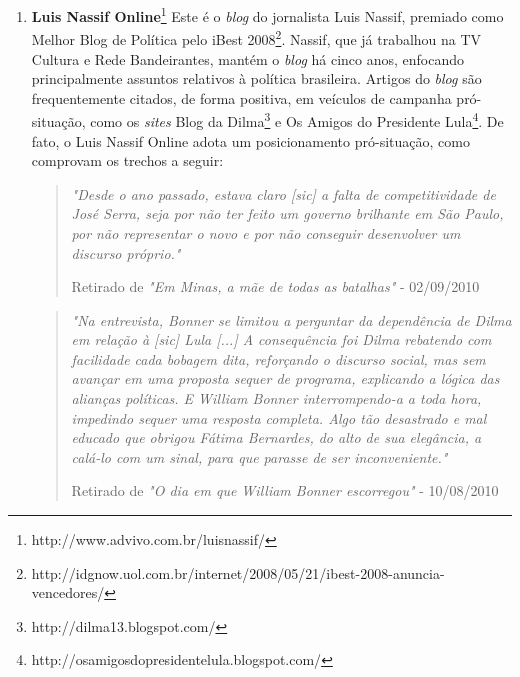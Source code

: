 \begin{enumerate}

\item \textbf{Luis Nassif Online}\footnote{http://www.advivo.com.br/luisnassif/} Este é o \emph{blog} do jornalista Luis Nassif, premiado como Melhor Blog de Política pelo iBest 2008\footnote{http://idgnow.uol.com.br/internet/2008/05/21/ibest-2008-anuncia-vencedores/}. Nassif, que já trabalhou na TV Cultura e Rede Bandeirantes, mantém o \emph{blog} há cinco anos, enfocando principalmente assuntos relativos à política brasileira. Artigos do \emph{blog} são frequentemente citados, de forma positiva, em veículos de campanha pró-situação, como os \emph{sites} Blog da Dilma\footnote{http://dilma13.blogspot.com/} e Os Amigos do Presidente Lula\footnote{http://osamigosdopresidentelula.blogspot.com/}. De fato, o Luis Nassif Online adota um posicionamento pró-situação, como comprovam os trechos a seguir:

\begin{quote}
\emph{"Desde o ano passado, estava claro [sic] a falta de competitividade de José Serra, seja por não ter feito um governo brilhante em São Paulo, por não representar o novo e por não conseguir desenvolver um discurso próprio."}

{\small Retirado de \emph{"Em Minas, a mãe de todas as batalhas"} - 02/09/2010} 
\end{quote}

\begin{quote}

\emph{"Na entrevista, Bonner se limitou a perguntar da dependência de Dilma em relação à [sic] Lula [...] A consequência foi Dilma rebatendo com facilidade cada bobagem dita, reforçando o discurso social, mas sem avançar em uma proposta sequer de programa, explicando a lógica das alianças políticas. E William Bonner interrompendo-a a toda hora, impedindo sequer uma resposta completa. Algo tão desastrado e mal educado que obrigou Fátima Bernardes, do alto de sua elegância, a calá-lo com um sinal, para que parasse de ser inconveniente."}

{ \small Retirado de \emph{"O dia em que William Bonner escorregou"} - 10/08/2010}

\end{quote}



\end{enumerate}
